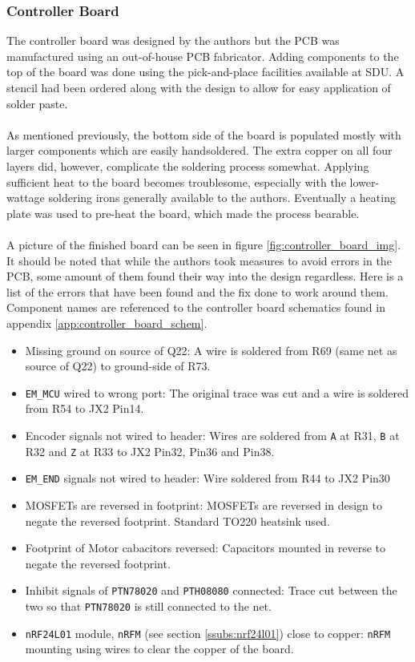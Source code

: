 \subsubsection{Controller Board} %
\label{ssub:controller_board}
The controller board was designed by the authors but the PCB was manufactured using an out-of-house PCB fabricator.
Adding components to the top of the board was done using the pick-and-place facilities available at SDU.
A stencil had been ordered along with the design to allow for easy application of solder paste.
\\~\\
As mentioned previously, the bottom side of the board is populated mostly with larger components which are easily handsoldered.
The extra copper on all four layers did, however, complicate the soldering process somewhat.
Applying sufficient heat to the board becomes troublesome, especially with the lower-wattage soldering irons generally available to the authors.
Eventually a heating plate was used to pre-heat the board, which made the process bearable.
\\~\\
A picture of the finished board can be seen in figure \ref{fig:controller_board_img}.
It should be noted that while the authors took measures to avoid errors in the PCB, some amount of them found their way into the design regardless.
Here is a list of the errors that have been found and the fix done to work around them.
Component names are referenced to the controller board schematics found in appendix \ref{app:controller_board_schem}.
\begin{itemize}
	\item Missing ground on source of Q22: A wire is soldered from R69 (same net as source of Q22) to ground-side of R73.
	\item \texttt{EM\_MCU} wired to wrong port: The original trace was cut and a wire is soldered from R54 to JX2 Pin14.
	\item Encoder signals not wired to header: Wires are soldered from \texttt{A} at R31, \texttt{B} at R32 and \texttt{Z} at R33 to JX2 Pin32, Pin36 and Pin38.
	\item \texttt{EM\_END} signals not wired to header: Wire soldered from R44 to JX2 Pin30
	\item MOSFETs are reversed in footprint: MOSFETs are reversed in design to negate the reversed footprint.
	Standard TO220 heatsink used.
	\item Footprint of Motor cabacitors reversed: Capacitors mounted in reverse to negate the reversed footprint.
	\item Inhibit signals of \texttt{PTN78020} and \texttt{PTH08080} connected: Trace cut between the two so that \texttt{PTN78020} is still connected to the net.
	\item \texttt{nRF24L01} module, \texttt{nRFM} (see section \ref{ssubs:nrf24l01}) close to copper: \texttt{nRFM} mounting using wires to clear the copper of the board.
\end{itemize}
